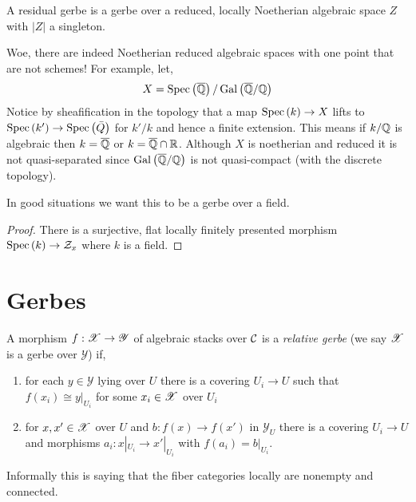 \documentclass[12pt]{article}
\begin{document}
\begin{prop}
A residual gerbe is a gerbe over a reduced, locally Noetherian algebraic space $Z$ with $|Z|$ a singleton. 
\end{prop}

\newcommand{\Qbar}{\overline{\Q}}

\begin{rmk}
Woe, there are indeed Noetherian reduced algebraic spaces with one point that are not schemes! For example, let,
\[ X = \Spec{\Qbar}/\, \Gal{\Qbar/\Q} \]
Notice by sheafification in the \etale topology that a map $\mathrm{Spec}\left( k \right) \to X$ lifts to $\mathrm{Spec}\left( k' \right) \to \mathrm{Spec}\left( \bar{Q} \right)$ for $k' / k$ \etale and hence a finite extension. This means if $k / \mathbb{Q}$ is algebraic then $k = \Qbar$ or $k = \Qbar \cap \RR$. Although $X$ is noetherian and reduced it is not quasi-separated since $\Gal{\Qbar/\Q}$ is not quasi-compact (with the discrete topology). 
\end{rmk}

\begin{rmk}
In good situations we want this to be a gerbe over a field. 
\end{rmk}

\begin{proof}
There is a surjective, flat locally finitely presented morphism $\mathrm{Spec}\left( k \right) \to \mathcal{Z}_x$ where $k$ is a field. 
\end{proof}

\section{Gerbes}

\newcommand{\Y}{\mathscr{Y}}

\begin{defn}
A morphism $f : \X \to \Y$ of algebraic stacks over $\mathcal{C}$ is a \textit{relative gerbe} (we say $\mathscr{X}$ is a gerbe over $\Y$) if,
\begin{enumerate}
\item for each $y \in \Y$ lying over $U$ there is a covering $U_i \to U$ such that $f(x_i) \cong y|_{U_i}$ for some $x_i \in \mathscr{X}$ over $U_i$
\item for $x,x' \in \mathscr{X}$ over $U$ and $b : f(x) \to f(x')$ in $\Y_U$ there is a covering $U_i \to U$ and morphisms $a_i : x|_{U_i} \to x'|_{U_i}$ with $f(a_i) = b|_{U_i}$. 
\end{enumerate}
\end{defn}

\begin{rmk}
Informally this is saying that the fiber categories locally are nonempty and connected. 
\end{rmk}
\end{document}
